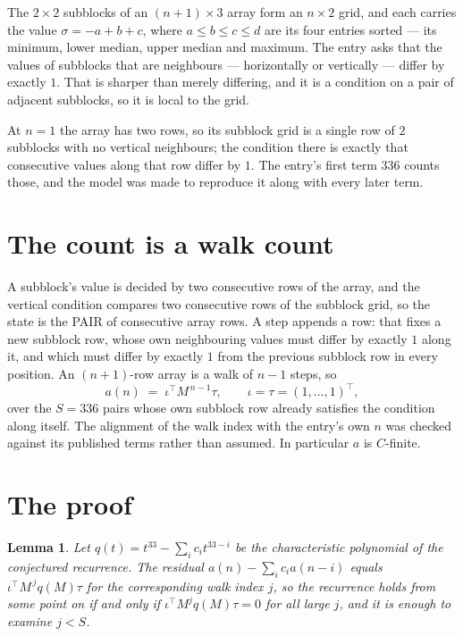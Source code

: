 \documentclass[11pt,a4paper]{article}
\theoremstyle{plain}
\newtheorem{lemma}[theorem]{Lemma}
\theoremstyle{definition}
\begin{document}
The $2\times2$ subblocks of an $(n+1)\times3$ array form an
$n\times2$ grid, and each carries the value $\sigma=-a+b+c$, where $a\le b\le c\le d$ are its four entries sorted --- its minimum, lower median, upper median and maximum. The entry asks that the values of
subblocks that are neighbours --- horizontally or vertically --- differ by exactly $1$.
That is sharper than merely differing, and it is a condition on a pair of adjacent subblocks,
so it is local to the grid.

At $n=1$ the array has two rows, so its subblock grid is a single row of $2$ subblocks with
no vertical neighbours; the condition there is exactly that consecutive values along that row
differ by $1$. The entry's first term $336$ counts those, and the model was made to
reproduce it along with every later term.

\section{The count is a walk count}

A subblock's value is decided by two consecutive rows of the array, and the
vertical condition compares two consecutive rows of the subblock grid, so the state is the
PAIR of consecutive array rows. A step appends a row: that fixes a new subblock row, whose own
neighbouring values must differ by exactly $1$ along it, and which must differ by exactly
$1$ from the previous subblock row in every position. An $(n+1)$-row array is a walk of
$n-1$ steps, so
\[
a(n)\;=\;\iota^{\!\top}M^{\,n-1}\tau,\qquad\iota=\tau=(1,\dots,1)^{\!\top},
\]
over the $S=336$ pairs whose own subblock row already satisfies the condition along itself.
The alignment of the walk index with the entry's own $n$ was checked against its published
terms rather than assumed. In particular $a$ is $C$-finite.

\section{The proof}

\begin{lemma}\label{lem:crit}
Let $q(t)=t^{33}-\sum_i c_it^{33-i}$ be the characteristic polynomial of the
conjectured recurrence. The residual $a(n)-\sum_ic_ia(n-i)$ equals
$\iota^{\!\top}M^{\,j}q(M)\tau$ for the corresponding walk index $j$, so the recurrence
holds from some point on if and only if $\iota^{\!\top}M^{j}q(M)\tau=0$ for all large $j$,
and it is enough to examine $j<S$.
\end{lemma}
\end{document}

